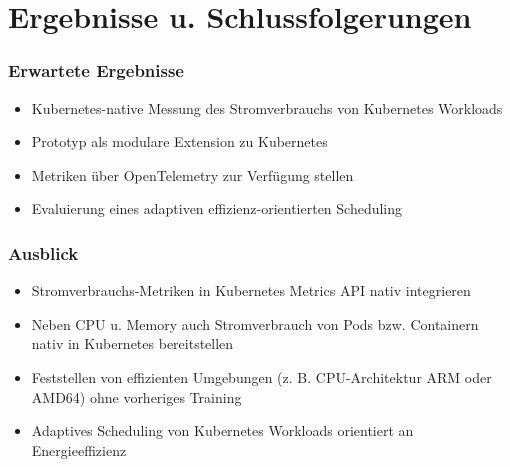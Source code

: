 \documentclass{beamer}
\begin{document}
\section{Ergebnisse u. Schlussfolgerungen}

\begin{frame}
	\frametitle{Erwartete Ergebnisse}
	\begin{itemize}
		\item Kubernetes-native Messung des Stromverbrauchs von Kubernetes Workloads
		\item Prototyp als modulare Extension zu Kubernetes
		\item Metriken über OpenTelemetry zur Verfügung stellen
		\item Evaluierung eines adaptiven effizienz-orientierten Scheduling
	\end{itemize}
\end{frame}

%
%
%

\begin{frame}
    \frametitle{Ausblick}
    \begin{itemize}
        \item Stromverbrauchs-Metriken in Kubernetes Metrics API nativ integrieren
        \item Neben CPU u. Memory auch Stromverbrauch von Pods bzw. Containern nativ in Kubernetes bereitstellen
        \item Feststellen von effizienten Umgebungen (z. B. CPU-Architektur ARM oder AMD64) ohne vorheriges Training
        \item Adaptives Scheduling von Kubernetes Workloads orientiert an Energieeffizienz
    \end{itemize}
\end{frame}
\end{document}
